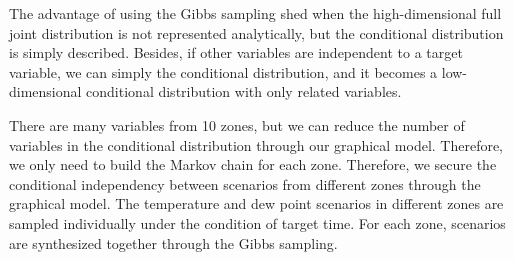 \documentclass[journal]{IEEEtran} %
\begin{document}
 

 
 
The advantage of using the Gibbs sampling shed when the high-dimensional full joint distribution is not represented analytically, but the conditional distribution is simply described. Besides, if other variables are independent to a target variable, we can simply the conditional distribution, and it becomes a low-dimensional conditional distribution with only related variables.


There are many variables from 10 zones, but we can reduce the number of variables in the conditional distribution through our graphical model. Therefore, we only need to build the Markov chain for each zone. Therefore, we secure the conditional independency between scenarios from different zones through the graphical model. The temperature and dew point scenarios in different zones are sampled individually under the condition of target time. For each zone, scenarios are synthesized together through the Gibbs sampling.
  
\end{document}
